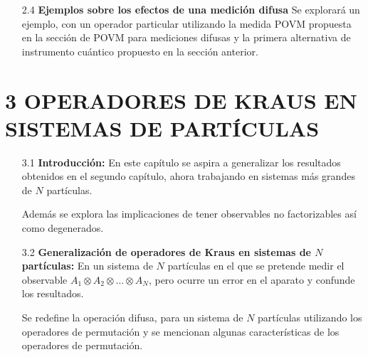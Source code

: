 \documentclass[12pt,oneside]{book}\raggedbottom{} %
\begin{document}
\begin{sloppypar}
{{\begin{itemize}
\begin{itemize}
  Se propone intuitivamente un conjunto de efectos con los que se obtiene un mapeo de las salidas de la medición difusa. Estos efectos se descomponen como operadores de Kraus, utilizando la operación raíz cuadrada debido a la positividad de los efectos. Sin embargo, esta descomposición no es única.
  \item[2.3.2] \textbf{Instrumentos cuánticos:} Se presenta la definición de una herramienta conocida como instrumento cuántico. A su vez se plantea la forma de calcular el valor esperado de la medición utilizando instrumentos cuánticos. 
  
  Se proponen dos alternativas  de instruments cuánticos con dos interpretaciones diferentes y sus respectivos cálculos de los valores esperados.
  \item[2.3.3] \textbf{Equivalencia de los instrumentos} En esta sección se comenta que se esperaba que los instrumentos fueran equivalentes pero resultaron distintos y por ello vale la pena proponer en qué condiciones sí lo son.
\end{itemize}
\item[2.4] \textbf{Ejemplos sobre los efectos de una medición difusa}
Se explorará un ejemplo, con un operador particular utilizando la medida POVM propuesta en la sección de POVM para mediciones difusas y la primera alternativa de instrumento cuántico propuesto en la sección anterior.
\end{itemize}
\section*{3 OPERADORES DE KRAUS EN SISTEMAS DE \texorpdfstring{}{N} PARTÍCULAS}
\begin{itemize}
\item[3.1] \textbf{Introducción:} En este capítulo se aspira a generalizar los resultados obtenidos en el segundo capítulo, ahora trabajando en sistemas más grandes de $N$ partículas.

Además se explora las implicaciones de tener observables no factorizables así como degenerados.
\item[3.2] \textbf{Generalización de operadores de Kraus en sistemas de $N$ partículas:} En un sistema de $N$ partículas en el que se pretende medir el observable $A_1\otimes A_2\otimes \hdots \otimes A_N$, pero ocurre un error en  el aparato y confunde los resultados.

Se redefine la operación difusa, para un sistema de $N$ partículas utilizando los operadores de permutación y se mencionan algunas características de los operadores de permutación. 


\end{itemize}}}
\end{sloppypar}
\end{document}
